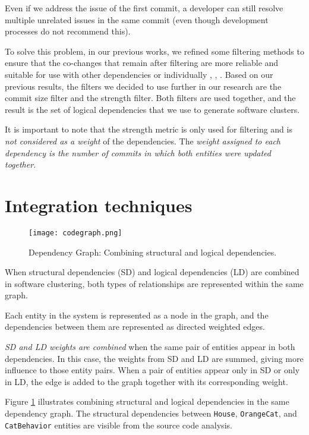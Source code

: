 Even if we address the issue of the first commit, a developer can still resolve multiple unrelated issues in the same commit (even though development processes do not recommend this).

To solve this problem, in our previous works, we refined some filtering methods to ensure that the co-changes that remain after filtering are more reliable and suitable for use with other dependencies or individually \cite{b4}, \cite{DepSACI}, \cite{enase19}. Based on our previous results, the filters we decided to use further in our research are the commit size filter and the strength filter. Both filters are used together, and the result is the set of logical dependencies that we use to generate software clusters.

It is important to note that the strength metric is only used for filtering and is \textit{not considered as a weight} of the dependencies. The \textit{weight assigned to each dependency is the number of commits in which both entities were updated together}.



\section{Integration techniques}
\label{sec:integration_techniques}



\begin{figure}[t!]
  \centering
  \texttt{[image: codegraph.png]}
  \caption{Dependency Graph: Combining structural and logical dependencies.}
  \label{fig:codegraph}
\end{figure}

When structural dependencies (SD) and logical dependencies (LD) are combined in software clustering, both types of relationships are represented within the same graph.

Each entity in the system is represented as a node in the graph, and the dependencies between them are represented as directed weighted edges.

\textit{SD and LD weights are combined} when the same pair of entities appear in both dependencies. In this case, the weights from SD and LD are summed, giving more influence to those entity pairs. When a pair of entities appear only in SD or only in LD, the edge is added to the graph together with its corresponding weight.

Figure \ref{fig:codegraph} illustrates combining structural and logical dependencies in the same dependency graph. The structural dependencies between \texttt{House}, \texttt{OrangeCat}, and \texttt{CatBehavior} entities are visible from the source code analysis.

